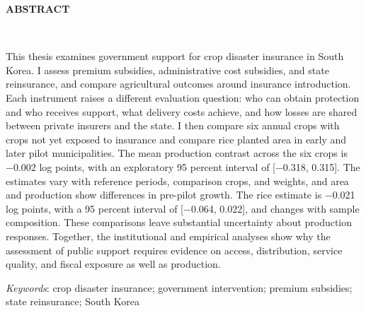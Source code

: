 {\centering\textbf{ABSTRACT}\par}
\vspace{34.5pt}
{\centering\fontsize{14}{24.15}\selectfont\bfseries \thesistitleA\\ \thesistitleB\par}
\vspace{34.5pt}

This thesis examines government support for crop disaster insurance in South Korea. I assess premium subsidies, administrative cost subsidies, and state reinsurance, and compare agricultural outcomes around insurance introduction. Each instrument raises a different evaluation question: who can obtain protection and who receives support, what delivery costs achieve, and how losses are shared between private insurers and the state. I then compare six annual crops with crops not yet exposed to insurance and compare rice planted area in early and later pilot municipalities. The mean production contrast across the six crops is −0.002 log points, with an exploratory 95 percent interval of [−0.318, 0.315]. The estimates vary with reference periods, comparison crops, and weights, and area and production show differences in pre-pilot growth. The rice estimate is −0.021 log points, with a 95 percent interval of [−0.064, 0.022], and changes with sample composition. These comparisons leave substantial uncertainty about production responses. Together, the institutional and empirical analyses show why the assessment of public support requires evidence on access, distribution, service quality, and fiscal exposure as well as production.

\vspace{20.7pt}
{\wordonehalf\noindent\emph{Keywords}: crop disaster insurance; government intervention; premium subsidies; state reinsurance; South Korea\par}
\clearpage
